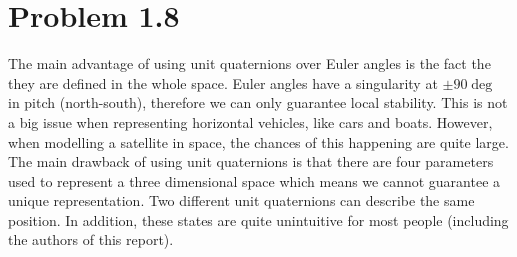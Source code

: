 \section*{Problem 1.8}

The main advantage of using unit quaternions over Euler angles is the fact the they are defined in the whole space. Euler angles have a singularity at $\pm 90 \deg$ in pitch (north-south), therefore we can only guarantee local stability. This is not a big issue when representing horizontal vehicles, like cars and boats. However, when modelling a satellite in space, the chances of this happening are quite large. \\
The main drawback of using unit quaternions is that there are four parameters used to represent a three dimensional space which means we cannot guarantee a unique representation. Two different unit quaternions can describe the same position.  In addition, these states are quite unintuitive for most people (including the authors of this report). 